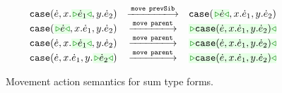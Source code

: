 \begin{figure}
\begin{displaymath}
\begin{array}{@{}rcl}
  \\
  \TABperformMove
      {      {\hcase{{\hexp}}{x}{\zwsel{\hexp_1}}{y}{\hexp_2}}}
      {\aMove{\dPrev}}
      {      {\hcase{{\zwsel{\hexp}}}{x}{{\hexp_1}}{y}{{\hexp_2}}}}
  \\
  \TABperformMove
      {      {\hcase{\zwsel{\hexp}}{x}{\hexp_1}{y}{\hexp_2}}}
      {\aMove{\dParent}}
      {\zwsel{\hcase{{\hexp}}{x}{\hexp_1}{y}{\hexp_2}}}
  \\
  \TABperformMove
      {      {\hcase{{\hexp}}{x}{\zwsel{\hexp_1}}{y}{\hexp_2}}}
      {\aMove{\dParent}}
      {\zwsel{\hcase{{\hexp}}{x}{\hexp_1}{y}{\hexp_2}}}
  \\
  \TABperformMove
      {      {\hcase{{\hexp}}{x}{\hexp_1}{y}{\zwsel{\hexp_2}}}}
      {\aMove{\dParent}}
      {\zwsel{\hcase{{\hexp}}{x}{\hexp_1}{y}{\hexp_2}}}
\end{array}
\end{displaymath}
\caption{Movement action semantics for sum type forms.}
\label{fig:sum-move}
\end{figure}


\iffalse
\begin{displaymath}
\begin{array}{@{}r@{~}l@{~~~}c@{~~~}ll@{~~}}
  \multicolumn{5}{l}{\textbf{Type Construction Actions for Sum Type}:}
  \\
  \TABperformTyp{\zwsel{\hehole}}{\aConstructx{\fsum}}
  {\tsum{\zwsel{\hehole}}{\hehole}}
  \\[3mm]
  \multicolumn{5}{l}{\textbf{Analytical Construction Actions for Sum Type}:}
  \\
  \TABperformAna{\hGamma}{\zwsel{\hehole}}
              {\tsum{\hehole}{\hehole}}
              {\aConstructx{\finj{i}}}
              {\hinj{i}{\zwsel{\hehole}}}
  \\
  \TABperformAna{\hGamma}{\zwsel{\hehole}}
              {\htau, \tincompat{\htau}{ \tsum{\hehole}{\hehole} }}
              {\aConstructx{\finj{i}}}
              {\hhole{\hinj{i}{\zwsel{\hehole}}}}
  \\
  \TABperformAna{\hGamma}{\zwsel{\hehole}}
              {\htau}
              {\aConstructx{\fcase{x}{y}}}
              {\hcase{\zwsel{\hehole}}{x}{\hehole}{y}{\hehole}}

\end{array}
\end{displaymath}
\fi
